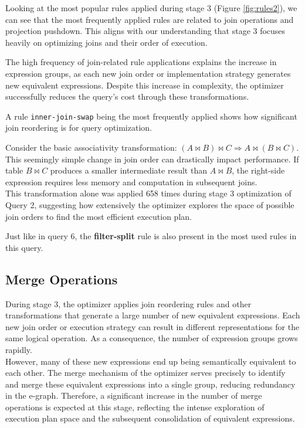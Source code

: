 \documentclass[a4paper,12pt]{scrreprt}
\begin{document}
Looking at the most popular rules applied during stage 3 (Figure \ref{fig:rules2}), we can see that the most frequently applied rules are related to join operations and projection pushdown. This aligns with our understanding that stage 3 focuses heavily on optimizing joins and their order of execution.

The high frequency of join-related rule applications explains the increase in expression groups, as each new join order or implementation strategy generates new equivalent expressions. Despite this increase in complexity, the optimizer successfully reduces the query's cost through these transformations.

A rule \texttt{inner-join-swap} being the most frequently applied shows how significant join reordering is for query optimization. 

Consider the basic associativity transformation: $(A \bowtie B) \bowtie C \Rightarrow A \bowtie (B \bowtie C)$. This seemingly simple change in join order can drastically impact performance. If table $B \bowtie C$ produces a smaller intermediate result than $A \bowtie B$, the right-side expression requires less memory and computation in subsequent joins. \\
This transformation alone was applied 658 times during stage 3 optimization of Query 2, suggesting how extensively the optimizer explores the space of possible join orders to find the most efficient execution plan.

Just like in query 6, the \textbf{filter-split} rule is also present in the most used rules in this query.

\subsection{Merge Operations}


During stage 3, the optimizer applies join reordering rules and other transformations that generate a large number of new equivalent expressions. Each new join order or execution strategy can result in different representations for the same logical operation. As a consequence, the number of expression groups grows rapidly. \\
However, many of these new expressions end up being semantically equivalent to each other. The merge mechanism of the optimizer serves precisely to identify and merge these equivalent expressions into a single group, reducing redundancy in the e-graph. Therefore, a significant increase in the number of merge operations is expected at this stage, reflecting the intense exploration of execution plan space and the subsequent consolidation of equivalent expressions.
\end{document}
